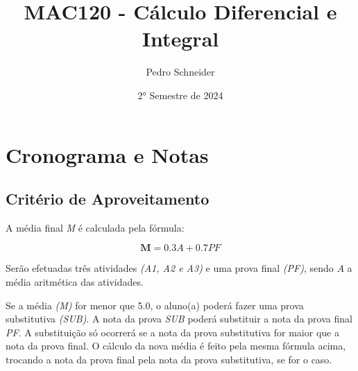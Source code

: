 \documentclass[12pt]{article}
\title{MAC120 - Cálculo Diferencial e Integral}
\author{Pedro Schneider}
\date{2° Semestre de 2024}
\begin{document}
\maketitle

\tableofcontents

\pagebreak
\section{Cronograma e Notas}

\subsection{Critério de Aproveitamento}
A média final \textit{M} é calculada pela fórmula:

\begin{center}
    \[
    \bm{M} = 0.3A + 0.7PF
    \]
\end{center}

\noindent
Serão efetuadas três atividades \textit{(A1, A2 e A3)} e uma prova final \textit{(PF)}, sendo $A$ a média aritmética das atividades.

\noindent
Se a média \textit{(M)} for menor que 5.0, o aluno(a) poderá fazer uma prova substitutiva \textit{(SUB)}.
A nota da prova \textit{SUB} poderá substituir a nota da prova final \textit{PF}.
A substituição só ocorrerá se a nota da prova substitutiva for maior que a nota da prova final.
O cálculo da nova média é feito pela mesma fórmula acima, trocando a nota da prova final pela nota da prova substitutiva, se for o caso.

\renewcommand{\arraystretch}{1.25} %
\end{document}
